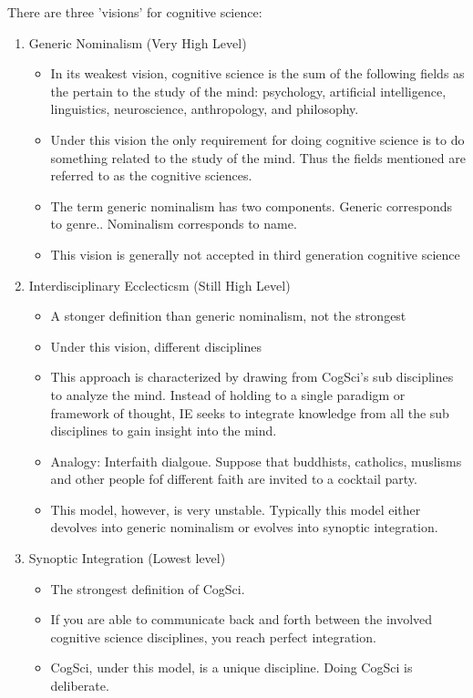\documentclass[twoside]{article}
\begin{document}
There are three 'visions' for cognitive science:
\begin{enumerate}
  \item Generic Nominalism (Very High Level)
    \begin{itemize}
      \item In its weakest vision, cognitive science is the sum of the following
            fields as the pertain to the study of the mind: psychology, artificial
            intelligence, linguistics, neuroscience, anthropology, and philosophy.
      \item Under this vision the only requirement for doing cognitive science
            is to do something related to the study of the mind. Thus the fields
            mentioned are referred to as the cognitive sciences.
      \item The term generic nominalism has two components. Generic corresponds
            to genre.. Nominalism corresponds to name.
      \item This vision is generally not accepted in third generation cognitive science
    \end{itemize}
  \item Interdisciplinary Ecclecticsm (Still High Level)
  \begin{itemize}
    \item A stonger definition than generic nominalism, not the strongest
    \item Under this vision, different disciplines
    \item This approach is characterized by drawing from CogSci's sub disciplines
          to analyze the mind. Instead of holding to a single paradigm or framework
          of thought, IE seeks to integrate knowledge from all the sub disciplines to
          gain insight into the mind.
    \item Analogy: Interfaith dialgoue. Suppose that buddhists, catholics, muslisms
          and other people fof different faith are invited to a cocktail party.
    \item This model, however, is very unstable. Typically this model either devolves
          into generic nominalism or evolves into synoptic integration.
  \end{itemize}
  \item Synoptic Integration (Lowest level)
  \begin{itemize}
    \item The strongest definition of CogSci.
    \item If you are able to communicate back and forth between the involved
          cognitive science disciplines, you reach perfect integration.
    \item CogSci, under this model, is a unique discipline. Doing CogSci is deliberate.
  \end{itemize}
\end{enumerate}
\end{document}
